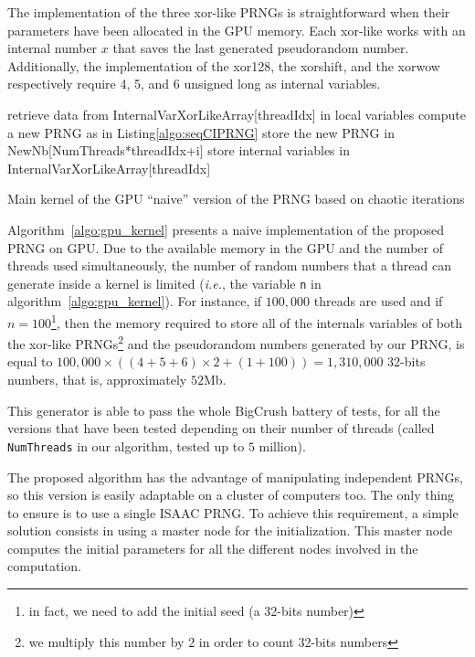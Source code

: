 \documentclass{article}
\begin{document}
The implementation of  the three
xor-like  PRNGs  is  straightforward  when  their  parameters  have  been
allocated in  the GPU memory.  Each xor-like  works with  an internal
number  $x$  that saves  the  last  generated  pseudorandom number. Additionally,  the
implementation of the  xor128, the xorshift, and the  xorwow respectively require
4, 5, and 6 unsigned long as internal variables.

\begin{algorithm}

 {
  retrieve data from InternalVarXorLikeArray[threadIdx] in local variables\;
   {
    compute a new PRNG as in Listing\ref{algo:seqCIPRNG}\;
    store the new PRNG in NewNb[NumThreads*threadIdx+i]\;
  }
  store internal variables in InternalVarXorLikeArray[threadIdx]\;
}

\caption{Main kernel of the GPU ``naive'' version of the PRNG based on chaotic iterations}
\label{algo:gpu_kernel}
\end{algorithm}

Algorithm~\ref{algo:gpu_kernel}  presents a naive  implementation of the proposed  PRNG on
GPU.  Due to the available  memory in the  GPU and the number  of threads
used simultaneously,  the number  of random numbers  that a thread  can generate
inside   a    kernel   is   limited  (\emph{i.e.},    the    variable   \texttt{n}   in
algorithm~\ref{algo:gpu_kernel}). For instance, if  $100,000$ threads are used and
if $n=100$\footnote{in fact, we need to add the initial seed (a 32-bits number)},
then   the  memory   required   to  store all of the  internals   variables  of both the  xor-like
PRNGs\footnote{we multiply this number by $2$ in order to count 32-bits numbers}
and  the pseudorandom  numbers generated by  our  PRNG,  is  equal to  $100,000\times  ((4+5+6)\times
2+(1+100))=1,310,000$ 32-bits numbers, that is, approximately $52$Mb.

This generator is able to pass the whole BigCrush battery of tests, for all
the versions that have been tested depending on their number of threads 
(called \texttt{NumThreads} in our algorithm, tested up to $5$ million).

\begin{remark}
The proposed algorithm has  the  advantage of  manipulating  independent
PRNGs, so this version is easily adaptable on a cluster of computers too. The only thing
to ensure is to use a single ISAAC PRNG. To achieve this requirement, a simple solution consists in
using a master node for the initialization. This master node computes the initial parameters
for all the different nodes involved in the computation.
\end{remark}
\end{document}
